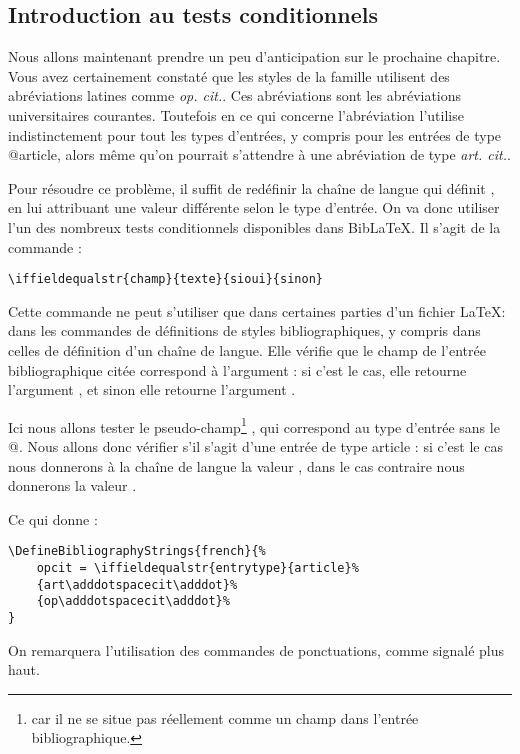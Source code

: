 \subsection{Introduction au tests conditionnels}

Nous allons maintenant prendre un peu d'anticipation sur le prochaine chapitre.
Vous avez certainement constaté que les styles de la famille  utilisent des abréviations latines comme \emph{op. cit.}.
Ces abréviations sont les abréviations universitaires courantes. Toutefois en ce qui concerne l'abréviation  l'utilise indistinctement pour tout les types d'entrées, y compris pour les entrées de type @article, alors même qu'on pourrait s'attendre à une abréviation de type \emph{art. cit.}.

Pour résoudre ce problème, il suffit de redéfinir la chaîne de langue qui définit , en lui attribuant une valeur différente selon le type d'entrée.  On va donc utiliser l'un des nombreux tests conditionnels disponibles dans BibLaTeX. Il s'agit de la commande :

\begin{verbatim}
\iffieldequalstr{champ}{texte}{sioui}{sinon}
\end{verbatim}

Cette commande ne peut s'utiliser que dans certaines parties d'un fichier \LaTeX : dans les commandes de définitions de styles bibliographiques, y compris dans celles de définition d'un chaîne de langue. 
Elle vérifie que le champ 	de l'entrée bibliographique citée correspond à l'argument  : si c'est le cas, elle retourne l'argument , et sinon elle retourne l'argument .

Ici nous allons tester le pseudo-champ\footnote{ car il ne se situe pas réellement comme un champ dans l'entrée bibliographique.} , qui correspond au type d'entrée sans le @. Nous allons donc vérifier s'il s'agit d'une entrée de type article : si c'est le cas nous donnerons à la chaîne de langue la valeur  ,  dans le cas contraire nous donnerons la valeur .

Ce qui donne : 

\begin{verbatim}
\DefineBibliographyStrings{french}{%
	opcit = \iffieldequalstr{entrytype}{article}%
	{art\adddotspacecit\adddot}%
	{op\adddotspacecit\adddot}%
}
\end{verbatim}

On remarquera l'utilisation des commandes de ponctuations, comme signalé plus haut.


	